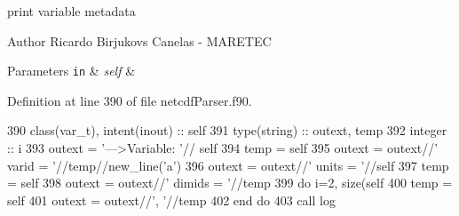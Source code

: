 print variable metadata 

\begin{DoxyAuthor}{Author}
Ricardo Birjukovs Canelas -\/ M\+A\+R\+E\+T\+EC 
\end{DoxyAuthor}

\begin{DoxyParams}[1]{Parameters}
\mbox{\tt in}  & {\em self} & \\
\hline
\end{DoxyParams}


Definition at line 390 of file netcdf\+Parser.\+f90.


\begin{DoxyCode}
390     \textcolor{keywordtype}{class}(var\_t), \textcolor{keywordtype}{intent(inout)} :: self
391     \textcolor{keywordtype}{type}(string) :: outext, temp
392     \textcolor{keywordtype}{integer} :: i
393     outext = \textcolor{stringliteral}{'--->Variable: '}// self%
394     temp = self%
395     outext = outext//\textcolor{stringliteral}{'       varid = '}//temp//new\_line(\textcolor{stringliteral}{'a'})
396     outext = outext//\textcolor{stringliteral}{'       units = '}//self%
397     temp = self%
398     outext = outext//\textcolor{stringliteral}{'       dimids = '}//temp
399     \textcolor{keywordflow}{do} i=2, \textcolor{keyword}{size}(self%
400         temp = self%
401         outext = outext//\textcolor{stringliteral}{', '}//temp
402 \textcolor{keywordflow}{    end do}
403     \textcolor{keyword}{call }log%
\end{DoxyCode}
